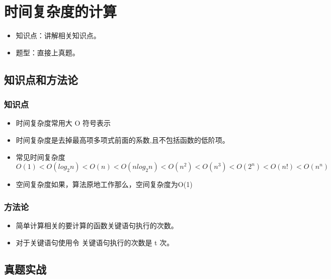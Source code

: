 \chapter{时间复杂度的计算}
\label{chap11}
\begin{itemize}[noitemsep,topsep=0pt,parsep=0pt,partopsep=0pt]
	\item 知识点：讲解相关知识点。
	\item 题型：直接上真题。
\end{itemize}

\section{知识点和方法论}

\subsection{知识点}
\begin{itemize}[noitemsep,topsep=0pt,parsep=0pt,partopsep=0pt]
	\item 时间复杂度常用大 O 符号表示
	\item 时间复杂度是去掉最高项多项式前面的系数,且不包括函数的低阶项。
	\item 常见时间复杂度$Ο(1)<Ο(log_2 n)<Ο(n)<Ο(nlog_2 n)<Ο(n^2)<Ο(n^3)<Ο(2^n)<O(n!)<O(n^n)$
	\item 空间复杂度如果，算法原地工作那么，空间复杂度为O(1)
\end{itemize}

\subsection{方法论}
\begin{itemize}[noitemsep,topsep=0pt,parsep=0pt,partopsep=0pt]
	\item 简单计算相关的要计算的函数关键语句执行的次数。
	\item 对于关键语句使用令 关键语句执行的次数是 t 次。
\end{itemize}

\section{真题实战}


